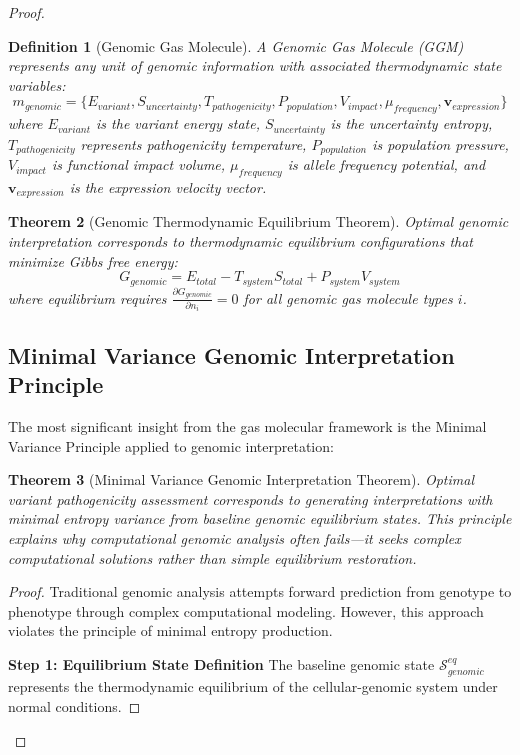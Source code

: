 \documentclass[12pt,a4paper]{article}
\newtheorem{theorem}{Theorem}[section]
\newtheorem{definition}[theorem]{Definition}
\begin{document}
\begin{proof}
\begin{definition}[Genomic Gas Molecule]
A Genomic Gas Molecule (GGM) represents any unit of genomic information with associated thermodynamic state variables:
$$m_{genomic} = \{E_{variant}, S_{uncertainty}, T_{pathogenicity}, P_{population}, V_{impact}, \mu_{frequency}, \mathbf{v}_{expression}\}$$
where $E_{variant}$ is the variant energy state, $S_{uncertainty}$ is the uncertainty entropy, $T_{pathogenicity}$ represents pathogenicity temperature, $P_{population}$ is population pressure, $V_{impact}$ is functional impact volume, $\mu_{frequency}$ is allele frequency potential, and $\mathbf{v}_{expression}$ is the expression velocity vector.
\end{definition}

\begin{theorem}[Genomic Thermodynamic Equilibrium Theorem]
Optimal genomic interpretation corresponds to thermodynamic equilibrium configurations that minimize Gibbs free energy:
$$G_{genomic} = E_{total} - T_{system} S_{total} + P_{system} V_{system}$$
where equilibrium requires $\frac{\partial G_{genomic}}{\partial n_i} = 0$ for all genomic gas molecule types $i$.
\end{theorem}

\subsection{Minimal Variance Genomic Interpretation Principle}

The most significant insight from the gas molecular framework is the Minimal Variance Principle applied to genomic interpretation:

\begin{theorem}[Minimal Variance Genomic Interpretation Theorem]
Optimal variant pathogenicity assessment corresponds to generating interpretations with minimal entropy variance from baseline genomic equilibrium states. This principle explains why computational genomic analysis often fails—it seeks complex computational solutions rather than simple equilibrium restoration.
\end{theorem}

\begin{proof}
Traditional genomic analysis attempts forward prediction from genotype to phenotype through complex computational modeling. However, this approach violates the principle of minimal entropy production.

\textbf{Step 1: Equilibrium State Definition}
The baseline genomic state $\mathcal{S}_{genomic}^{eq}$ represents the thermodynamic equilibrium of the cellular-genomic system under normal conditions.


\end{proof}
\end{proof}
\end{document}
